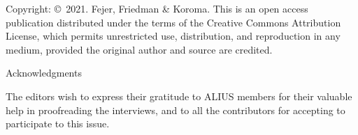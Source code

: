 \clearpage
\thispagestyle{empty}
\vspace*{4.0cm}
{\AliusLatoLight\fontsize{12}{16}\selectfont
Copyright: \copyright\ 2021. Fejer, Friedman \& Koroma. This is an open access publication distributed under the terms of the Creative Commons Attribution License, which permits unrestricted use, distribution, and reproduction in any medium, provided the original author and source are credited.\par
}
\clearpage

\clearpage
\thispagestyle{empty}
\vspace*{3.7cm}
{\AliusLato\fontsize{20}{24}\selectfont Acknowledgments\par}
\vspace{1.1cm}
{\fontsize{14}{17}\selectfont
The editors wish to express their gratitude to ALIUS members for their valuable help in proofreading the interviews, and to all the contributors for accepting to participate to this issue.\par
}
\clearpage

\AliusIssueBlankPage

